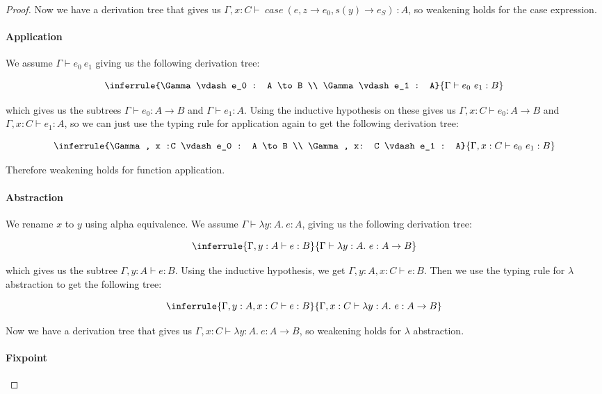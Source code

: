 \begin{proof}
Now we have a derivation tree that gives us $\Gamma, x : C \vdash \ case \ (e, z \to e_0 , s(y) \to e_S) \  : A$, so weakening holds for the case expression.
 
\paragraph{Application} We assume $\Gamma \vdash e_0 \ e_1$ giving us the following derivation tree:

$$
\inferrule{\Gamma \vdash e_0 : A \to B \\ \Gamma \vdash e_1 : A}{\Gamma \vdash e_0 \ e_1 : B}
$$

which gives us the subtrees $\Gamma \vdash e_0 : A \to B$ and $\Gamma \vdash e_1 : A$. Using the inductive hypothesis on these gives us $\Gamma, x : C \vdash e_0 : A \to B$ and $\Gamma, x : C \vdash e_1 : A$, so we can just use the typing rule for application again to get the following derivation tree:

$$
\inferrule{\Gamma, x :C \vdash e_0 : A \to B \\ \Gamma, x: C \vdash e_1 : A}{\Gamma, x : C \vdash e_0 \ e_1 : B}
$$

Therefore weakening holds for function application.


\paragraph{Abstraction} We rename $x$ to $y$ using alpha equivalence. We assume $\Gamma \vdash \lambda y : A. \ e : A$, giving us the following derivation tree:

$$
\inferrule{\Gamma, y : A \vdash e : B}{\Gamma \vdash \lambda y : A. \ e : A \to B}
$$

which gives us the subtree $\Gamma , y:A \vdash e : B$. Using the inductive hypothesis, we get $\Gamma , y:A , x : C \vdash e : B$. Then we use the typing rule for $\lambda$ abstraction to get the following tree:

$$
\inferrule{\Gamma, y : A, x : C \vdash e : B}{\Gamma, x : C \vdash \lambda y : A. \ e : A \to B}
$$

Now we have a derivation tree that gives us $\Gamma, x : C \vdash \lambda y : A . \ e : A \to B$, so weakening holds for $\lambda$ abstraction.
 

\paragraph{Fixpoint}
 

\end{proof}
